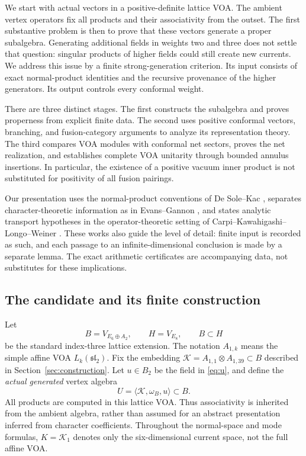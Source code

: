 \documentclass[11pt,a4paper]{article}
\theoremstyle{definition}
\begin{document}
We start with actual vectors in a positive-definite lattice VOA. The
ambient vertex operators fix all products and their associativity from
the outset. The first substantive problem is then to prove that these
vectors generate a proper subalgebra. Generating additional fields in
weights two and three does not settle that question: singular products
of higher fields could still create new currents. We address this issue
by a finite strong-generation criterion. Its input consists of exact
normal-product identities and the recursive provenance of the higher
generators. Its output controls every conformal weight.

There are three distinct stages. The first constructs the subalgebra and
proves properness from explicit finite data. The second uses positive
conformal vectors, branching, and fusion-category arguments to analyze
its representation theory. The third compares VOA modules with conformal
net sectors, proves the net realization, and establishes complete
VOA unitarity through bounded annulus insertions. In particular,
the existence of a positive vacuum inner product is not substituted for
positivity of all fusion pairings.

Our presentation uses the normal-product conventions of De Sole--Kac
\cite[Section 2]{DSK}, separates character-theoretic information as in
Evans--Gannon \cite{EG}, and states analytic transport hypotheses in the
operator-theoretic setting of Carpi--Kawahigashi--Longo--Weiner \cite{CKLW}.
These works also guide the level of detail: finite input is recorded as
such, and each passage to an infinite-dimensional conclusion is made by
a separate lemma. The exact arithmetic certificates are accompanying
data, not substitutes for these implications.

\subsection{The candidate and its finite construction}

Let
\[
 B=V_{E_6\oplus A_2},\qquad H=V_{E_8},\qquad B\subset H
\]
be the standard index-three lattice extension. The notation \(A_{1,k}\)
means the simple affine VOA \(L_k(\mathfrak{sl}_2)\). Fix the embedding
\(\mathcal K=A_{1,1}\otimes A_{1,39}\subset B\) described in
Section~\ref{sec:construction}. Let \(u\in B_2\) be the field in
\eqref{eq:u}, and define the \emph{actual generated} vertex algebra
\begin{equation}\label{eq:U}
 U=\langle\mathcal K,\omega_B,u\rangle\subset B.
\end{equation}
All products are computed in this lattice VOA. Thus associativity is
inherited from the ambient algebra, rather than assumed for an abstract
presentation inferred from character coefficients.
Throughout the normal-space and mode formulas, \(K=\mathcal K_1\)
denotes only the six-dimensional current space, not the full affine VOA.
\end{document}
